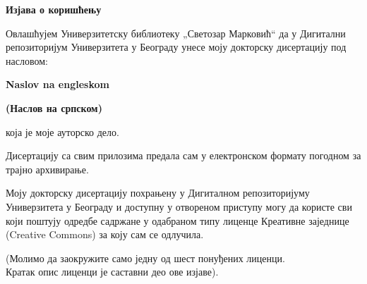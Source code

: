 
\cleardoublepage
\thispagestyle{empty}

\renewcommand{\headrulewidth}{0pt}
\setlength{\parindent}{0pt}

\normalsize

\mbox{}
\vspace{1cm}

\begin{center}
\begin{Large}\textbf{Изјава о коришћењу}
\end{Large}\end{center}

\vspace{1cm}

Овлашћујем Универзитетску библиотеку „Светозар Марковић“ да у Дигитални 
репозиторијум Универзитета у Београду унесе моју докторску дисертацију под 
насловом:

{
\textbf{Naslov na engleskom}}

\textbf{(Наслов на српском)}

која је моје ауторско дело. 

Дисертацију са свим прилозима предала сам у електронском формату погодном за 
трајно архивирање. 

Моју докторску дисертацију похрањену у Дигиталном репозиторијуму Универзитета у 
Београду и доступну у отвореном приступу могу да користе сви који поштују 
одредбе садржане у одабраном типу лиценце Креативне заједнице (Creative Commons) 
за коју сам се одлучила.
(Молимо да заокружите само једну од шест понуђених лиценци. \\
Кратак опис лиценци је саставни део ове изјаве).



